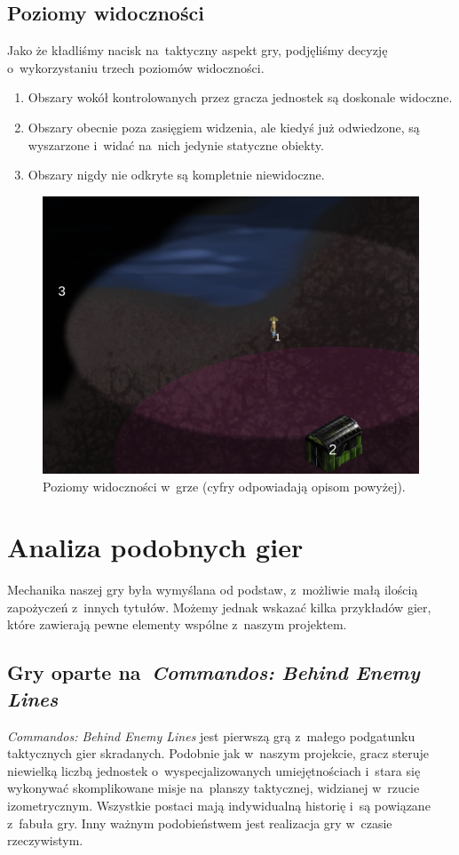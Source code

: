 \documentclass[licencjacka]{pracamgr}
\begin{document}
    \subsection{Poziomy widoczności}
      Jako że kładliśmy nacisk na~taktyczny aspekt gry, podjęliśmy decyzję o~wykorzystaniu trzech poziomów widoczności. 
      \begin{enumerate}
       \item Obszary wokół kontrolowanych przez gracza jednostek są doskonale widoczne.
       \item Obszary obecnie poza zasięgiem widzenia, ale kiedyś już odwiedzone, są wyszarzone i~widać na~nich jedynie statyczne obiekty.
       \item Obszary nigdy nie odkryte są kompletnie niewidoczne.
      \end{enumerate}

      \begin{figure}[htbp]
	\centering
	\includegraphics[scale=0.4]{fow.png}
	\caption{Poziomy widoczności w~grze (cyfry odpowiadają opisom powyżej).}
      \end{figure}

  \section{Analiza podobnych gier}
    Mechanika naszej gry była wymyślana od podstaw, z~możliwie małą ilością zapożyczeń z~innych tytułów. Możemy jednak wskazać
    kilka przykładów gier, które zawierają pewne elementy wspólne z~naszym projektem.
    \subsection{Gry oparte na~\emph{Commandos: Behind Enemy Lines}}
      \emph{Commandos: Behind Enemy Lines} jest pierwszą grą z~małego podgatunku taktycznych gier skradanych. Podobnie jak
      w~naszym projekcie, gracz steruje niewielką liczbą jednostek o~wyspecjalizowanych umiejętnościach i~stara się wykonywać skomplikowane
      misje na~planszy taktycznej, widzianej w~rzucie izometrycznym. Wszystkie postaci mają indywidualną historię i~są powiązane
      z~fabuła gry. Inny ważnym podobieństwem jest realizacja gry w~czasie rzeczywistym.
\end{document}

